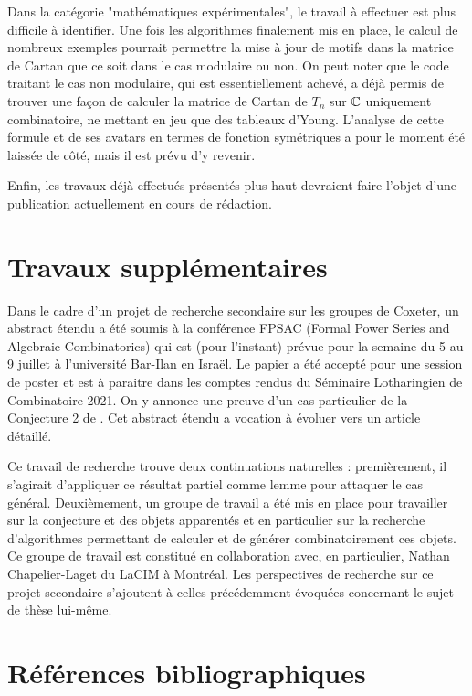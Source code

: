 \documentclass{article}
\begin{document}
	Dans la catégorie "mathématiques expérimentales", le travail à effectuer est plus difficile à identifier. Une fois les algorithmes finalement mis en place, le calcul de nombreux exemples pourrait permettre la mise à jour de motifs dans la matrice de Cartan que ce soit dans le cas modulaire ou non. On peut noter que le code traitant le cas non modulaire, qui est essentiellement achevé, a déjà permis de trouver une façon de calculer la matrice de Cartan de $T_n$ sur $\mathbb{C}$ uniquement combinatoire, ne mettant en jeu que des tableaux d'Young. L'analyse de cette formule et de ses avatars en termes de fonction symétriques a pour le moment été laissée de côté, mais il est prévu d'y revenir.
	
	Enfin, les travaux déjà effectués présentés plus haut devraient faire l'objet d'une publication actuellement en cours de rédaction.
	
		\section*{Travaux supplémentaires}
	
	Dans le cadre d'un projet de recherche secondaire sur les groupes de Coxeter, un abstract étendu \cite{Baba2020} a été soumis à la conférence FPSAC (Formal Power Series and Algebraic Combinatorics) qui est (pour l'instant) prévue pour la semaine du 5 au 9 juillet à l'université Bar-Ilan en Israël. Le papier a été accepté pour une session de poster et est à paraitre dans les comptes rendus du Séminaire Lotharingien de Combinatoire 2021. On y annonce une preuve d'un cas particulier de la Conjecture 2 de \cite{dyer2016small}. Cet  abstract étendu a vocation à évoluer vers un article détaillé. 
	
	Ce travail de recherche trouve deux continuations naturelles : premièrement, il s'agirait d'appliquer ce résultat partiel comme lemme pour attaquer le cas général. Deuxièmement, un groupe de travail a été mis en place pour travailler sur la conjecture et des objets apparentés et en particulier sur la recherche d'algorithmes permettant de calculer et de générer combinatoirement ces objets. Ce groupe de travail est constitué en collaboration avec, en particulier, Nathan Chapelier-Laget du LaCIM à Montréal. Les perspectives de recherche sur ce projet secondaire s'ajoutent à celles précédemment évoquées concernant le sujet de thèse lui-même.
	
	\clearpage
	
	\section*{Références bibliographiques}
	
	\printbibliography
	
\end{document}
